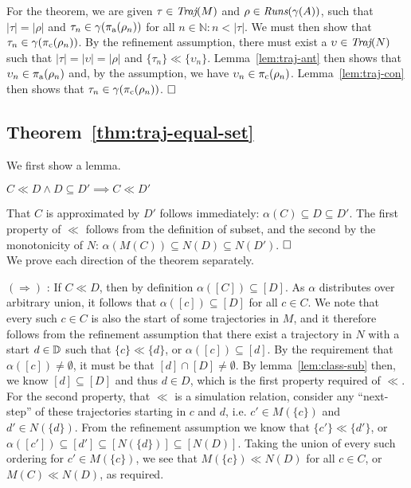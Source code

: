 For the theorem, we are given $\tau \in \operatorname{\textit{Traj}}(M)$ and $\rho \in \operatorname{\textit{Runs}}(\gamma(A))$, such that $| \tau | = | \rho |$ and $\tau_{n} \in \gamma(\operatorname{\pi_{\textrm{a}}}(\rho_{n}))$ for all $n \in \mathbb{N} : n < | \tau |$. We must then show that $\tau_{n} \in \gamma(\operatorname{\pi_{\textrm{c}}}(\rho_{n}))$. By the refinement assumption, there must exist a $\upsilon \in \operatorname{\textit{Traj}}(N)$ such that $| \tau | = | \upsilon | = | \rho |$ and $\{ \tau_{n} \} \ll \{ \upsilon_{n} \}$. Lemma~\ref{lem:traj-ant} then shows that $\upsilon_{n} \in \operatorname{\pi_{\textrm{a}}}(\rho_{n})$ and, by the assumption, we have $\upsilon_{n} \in \operatorname{\pi_{\textrm{c}}}(\rho_{n})$. Lemma~\ref{lem:traj-con} then shows that $\tau_{n} \in \gamma(\operatorname{\pi_{\textrm{c}}}(\rho_{n}))$. $\qedbox$

\subsection{Theorem~\ref{thm:traj-equal-set}}

We first show a lemma.

\begin{lemma} \label{lem:ll-sub}
$C \ll D \wedge D \subseteq D' \implies C \ll D'$
\end{lemma}

That $C$ is approximated by $D'$ follows immediately: $\alpha(C) \subseteq D \subseteq D'$. The first property of $\ll$ follows from the definition of subset, and the second by the monotonicity of $N$: $\alpha(M(C)) \subseteq N(D) \subseteq N(D')$. $\qedbox$
\\

We prove each direction of the theorem separately.

$(\Rightarrow)$ : If $C \ll D$, then by definition $\alpha([C]) \subseteq [D]$. As $\alpha$ distributes over arbitrary union, it follows that $\alpha([c]) \subseteq [D]$ for all $c \in C$. We note that every such $c \in C$ is also the start of some trajectories in $M$, and it therefore follows from the refinement assumption that there exist a trajectory in $N$ with a start $d \in \mathbb{D}$ such that $\{ c \} \ll \{ d \}$, or $\alpha([c]) \subseteq [d]$. By the requirement that $\alpha([c]) \neq \emptyset$, it must be that $[d] \cap [D] \neq \emptyset$. By lemma~\ref{lem:class-sub} then, we know $[d] \subseteq [D]$ and thus $d \in D$, which is the first property required of $\ll$. For the second property, that $\ll$ is a simulation relation, consider any ``next-step'' of these trajectories starting in $c$ and $d$, i.e. $c' \in M(\{ c \})$ and $d' \in N(\{ d \})$. From the refinement assumption we know that $\{ c' \} \ll \{ d' \}$, or $\alpha([c']) \subseteq [d'] \subseteq [N(\{ d \})] \subseteq [N(D)]$. Taking the union of every such ordering for $c' \in M(\{ c \})$, we see that $M(\{ c \}) \ll N(D)$ for all $c \in C$, or $M(C) \ll N(D)$, as required.

